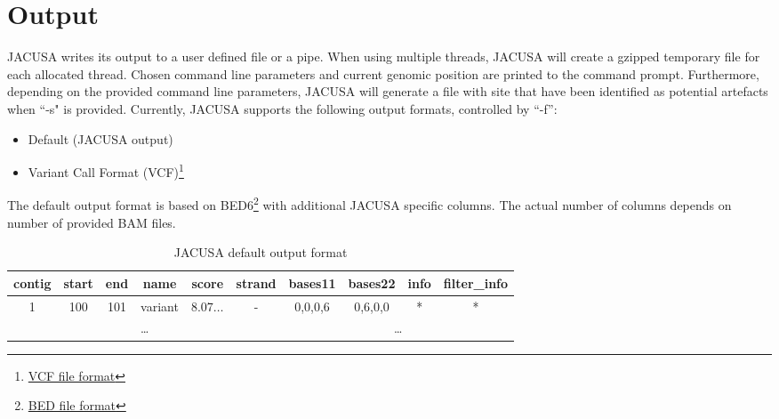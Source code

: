\documentclass[10pt, a4paper]{article}
\begin{document}
\section{Output}
JACUSA writes its output to a user defined file or a pipe. When using multiple threads, JACUSA will
create a gzipped temporary file for each allocated thread. Chosen command line parameters
and current genomic position are printed to the command prompt. Furthermore, depending on
the provided command line parameters, JACUSA will generate a file with site that have been
identified as potential artefacts when ``-s" is provided. Currently, JACUSA supports the following
output formats, controlled by ``-f'':
\begin{itemize}
  \item Default (JACUSA output)
  \item Variant Call Format
  (VCF)\footnote{\href{http://samtools.github.io/hts-specs/VCFv4.1.pdf]}{VCF file format}}
\end{itemize}
The default output format is based on
BED6\footnote{\href{http://genome.ucsc.edu/FAQ/FAQformat.html\#format1}{BED file format}} with
additional JACUSA specific columns. The actual number of columns depends on number of provided BAM
files.
\begin{table}
\caption{JACUSA default output format}
\begin{tabular}{cccccc|cccc}
contig & start & end & name & score & strand & bases11 & bases22 & info & filter\_info \\
\hline
1 & 100 & 101 & variant & $8.07\ldots$ & - & 0,0,0,6 & 0,6,0,0 & * & * \\	
\multicolumn{6}{c|}{\ldots} & \multicolumn{4}{c}{\ldots}
\end{tabular}
\end{table}
\end{document}
